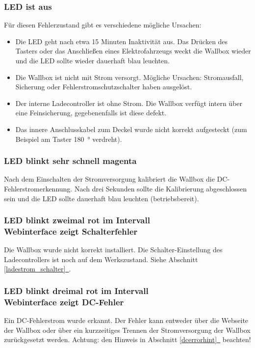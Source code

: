 \documentclass[a4paper,10pt]{article}
\newcommand*{\fullref}[1]{Abschnitt \hyperref[{#1}]{\ref*{#1}~\nameref*{#1}}}
\begin{document}
\begin{multicols*}{2}
    \subsubsection*{LED ist aus}
    Für diesen Fehlerzustand gibt es verschiedene mögliche Ursachen:
    \begin{itemize}
        \item Die LED geht nach etwa 15 Minuten Inaktivität aus. Das Drücken des Tasters
              oder das Anschließen eines Elektrofahrzeugs weckt die Wallbox wieder
              und die LED sollte wieder dauerhaft blau leuchten.
        \item Die Wallbox ist nicht mit Strom versorgt. Mögliche Ursachen: Stromausfall,
              Sicherung oder Fehlerstrom\-schutzschalter haben ausgelöst.
        \item Der interne Ladecontroller ist ohne Strom. Die Wallbox verfügt
		intern über eine Feinsicherung, gegebenenfalls ist diese defekt.
        \item Das innere Anschlusskabel zum Deckel wurde nicht korrekt aufgesteckt (zum Beispiel am Taster \SI{180}{\degree} verdreht).
    \end{itemize}

    \subsubsection*{LED blinkt sehr schnell magenta}\label{fast_blink}
    Nach dem Einschalten der Stromversorgung kalibriert die Wallbox die
    DC-Fehlerstromerkennung. Nach drei Sekunden sollte die Kalibrierung
    abgeschlossen sein und die LED sollte dauerhaft blau leuchten
    (betriebsbereit).

    \subsubsection*{LED blinkt zweimal rot im Intervall \\ Webinterface zeigt Schalterfehler}
    Die Wallbox wurde nicht korrekt installiert. Die Schalter-Einstellung des Ladecontrollers ist
    noch auf dem Werkszustand. Siehe \fullref{ladestrom_schalter}.

    \begin{minipage}{\linewidth} %
        \subsubsection*{LED blinkt dreimal rot im Intervall \\ Webinterface zeigt DC-Fehler}
        Ein DC-Fehlerstrom wurde erkannt. Der Fehler kann entweder über die Webseite der Wallbox oder über
        ein kurzzeitiges Trennen der Stromversorgung der Wallbox zurückgesetzt
        werden. Achtung: den Hinweis in \fullref{dcerrorhint} beachten!
    \end{minipage}


\end{multicols*}
\end{document}
